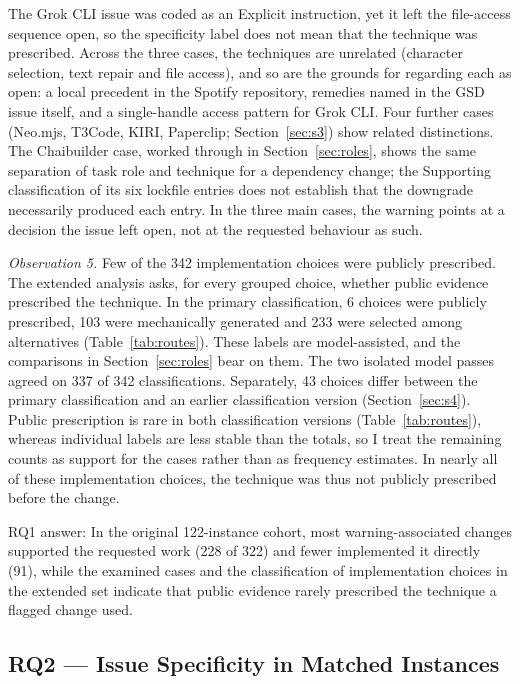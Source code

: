 \documentclass[acmsmall,screen,nonacm,review]{acmart}
\begin{document}
The Grok CLI issue was coded as an Explicit instruction, yet it left the file-access sequence open, so the specificity label does not mean that the technique was prescribed. Across the three cases, the techniques are unrelated (character selection, text repair and file access), and so are the grounds for regarding each as open: a local precedent in the Spotify repository, remedies named in the GSD issue itself, and a single-handle access pattern for Grok CLI. Four further cases (Neo.mjs, T3Code, KIRI, Paperclip; Section~\ref{sec:s3}) show related distinctions. The Chaibuilder case, worked through in Section~\ref{sec:roles}, shows the same separation of task role and technique for a dependency change; the Supporting classification of its six lockfile entries does not establish that the downgrade necessarily produced each entry. In the three main cases, the warning points at a decision the issue left open, not at the requested behaviour as such.

\emph{Observation 5.} Few of the 342 implementation choices were publicly prescribed. The extended analysis asks, for every grouped choice, whether public evidence prescribed the technique. In the primary classification, 6 choices were publicly prescribed, 103 were mechanically generated and 233 were selected among alternatives (Table~\ref{tab:routes}). These labels are model-assisted, and the comparisons in Section~\ref{sec:roles} bear on them. The two isolated model passes agreed on 337 of 342 classifications. Separately, 43 choices differ between the primary classification and an earlier classification version (Section~\ref{sec:s4}). Public prescription is rare in both classification versions (Table~\ref{tab:routes}), whereas individual labels are less stable than the totals, so I treat the remaining counts as support for the cases rather than as frequency estimates. In nearly all of these implementation choices, the technique was thus not publicly prescribed before the change.

RQ1 answer: In the original 122-instance cohort, most warning-associated changes supported the requested work (228 of 322) and fewer implemented it directly (91), while the examined cases and the classification of implementation choices in the extended set indicate that public evidence rarely prescribed the technique a flagged change used.

\subsection{RQ2 --- Issue Specificity in Matched Instances}\label{sec:rq2-res}
\end{document}
